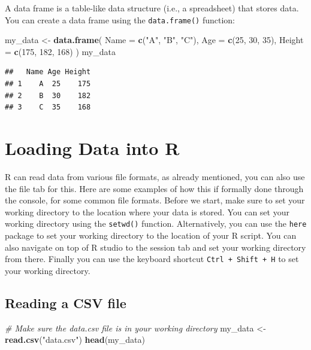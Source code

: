 \documentclass[
]{book}
\newenvironment{Shaded}{\begin{snugshade}}{\end{snugshade}}
\newcommand{\AttributeTok}[1]{\textcolor[rgb]{0.13,0.29,0.53}{#1}}
\newcommand{\CommentTok}[1]{\textcolor[rgb]{0.56,0.35,0.01}{\textit{#1}}}
\newcommand{\DecValTok}[1]{\textcolor[rgb]{0.00,0.00,0.81}{#1}}
\newcommand{\FunctionTok}[1]{\textcolor[rgb]{0.13,0.29,0.53}{\textbf{#1}}}
\newcommand{\NormalTok}[1]{#1}
\newcommand{\OtherTok}[1]{\textcolor[rgb]{0.56,0.35,0.01}{#1}}
\newcommand{\StringTok}[1]{\textcolor[rgb]{0.31,0.60,0.02}{#1}}
\begin{document}
A data frame is a table-like data structure (i.e., a spreadsheet) that stores data. You can create a data frame using the
\texttt{data.frame()} function:

\begin{Shaded}
\begin{Highlighting}[]
\NormalTok{my\_data }\OtherTok{\textless{}{-}} \FunctionTok{data.frame}\NormalTok{(}
  \AttributeTok{Name =} \FunctionTok{c}\NormalTok{(}\StringTok{"A"}\NormalTok{, }\StringTok{"B"}\NormalTok{, }\StringTok{"C"}\NormalTok{),}
  \AttributeTok{Age =} \FunctionTok{c}\NormalTok{(}\DecValTok{25}\NormalTok{, }\DecValTok{30}\NormalTok{, }\DecValTok{35}\NormalTok{),}
  \AttributeTok{Height =} \FunctionTok{c}\NormalTok{(}\DecValTok{175}\NormalTok{, }\DecValTok{182}\NormalTok{, }\DecValTok{168}\NormalTok{)}
\NormalTok{)}
\NormalTok{my\_data}
\end{Highlighting}
\end{Shaded}

\begin{verbatim}
##   Name Age Height
## 1    A  25    175
## 2    B  30    182
## 3    C  35    168
\end{verbatim}

\section{Loading Data into R}\label{loading-data-into-r}

R can read data from various file formats, as already mentioned, you can also use the file tab for this. Here are some examples of how this if formally done through the console, for some common file formats. Before we start, make sure to set your working directory to the location where your data is stored. You can set your working directory using the \texttt{setwd()} function. Alternatively, you can use the \texttt{here} package to set your working directory to the location of your R script. You can also navigate on top of R studio to the session tab and set your working directory from there. Finally you can use the keyboard shortcut \texttt{Ctrl\ +\ Shift\ +\ H} to set your working directory.

\subsection{Reading a CSV file}\label{reading-a-csv-file}

\begin{Shaded}
\begin{Highlighting}[]
\CommentTok{\# Make sure the \textquotesingle{}data.csv\textquotesingle{} file is in your working directory}
\NormalTok{my\_data }\OtherTok{\textless{}{-}} \FunctionTok{read.csv}\NormalTok{(}\StringTok{"data.csv"}\NormalTok{)}
\FunctionTok{head}\NormalTok{(my\_data)}
\end{Highlighting}
\end{Shaded}
\end{document}
